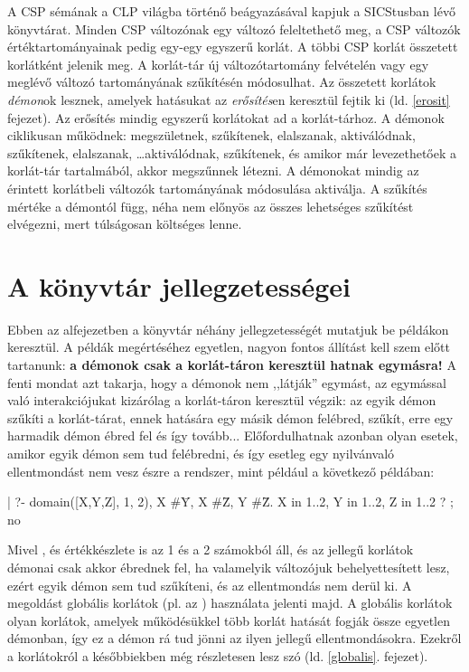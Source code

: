 A CSP sémának a CLP világba történő beágyazásával kapjuk a SICStusban lévő
\clpfd könyvtárat. Minden CSP változónak egy \clpfd változó feleltethető meg,
a CSP változók értéktartományainak pedig egy-egy \clpfd egyszerű korlát.
A többi CSP korlát összetett \clpfd korlátként jelenik meg. A \clpfd korlát-tár
új változótartomány felvételén vagy egy meglévő változó tartományának
szűkítésén módosulhat. Az összetett korlátok \emph{démon}ok lesznek, amelyek
hatásukat az \emph{erősítés}en keresztül fejtik ki (ld. \ref{erosit} fejezet).
Az erősítés mindig egyszerű korlátokat ad a korlát-tárhoz. A démonok ciklikusan
működnek: megszületnek, szűkítenek, elalszanak, aktiválódnak, szűkítenek,
elalszanak, \ldots aktiválódnak, szűkítenek, és amikor már levezethetőek a
korlát-tár tartalmából, akkor megszűnnek létezni. A démonokat mindig az
érintett korlátbeli változók tartományának módosulása aktiválja. A szűkítés
mértéke a démontól függ, néha nem előnyös az összes lehetséges szűkítést
elvégezni, mert túlságosan költséges lenne.

\section{A \clpfd könyvtár jellegzetességei}

Ebben az alfejezetben a \clpfd könyvtár néhány jellegzetességét mutatjuk be
példákon keresztül. A példák megértéséhez egyetlen, nagyon fontos állítást
kell szem előtt tartanunk: {\bf a \clpfd démonok csak a korlát-táron keresztül
hatnak egymásra!}
\br
A fenti mondat azt takarja, hogy a démonok nem ,,látják'' egymást, az
egymással való interakciójukat kizárólag a korlát-táron keresztül
végzik: az egyik démon szűkíti a korlát-tárat, ennek hatására egy
másik démon felébred, szűkít, erre egy harmadik démon ébred fel
és így tovább... Előfordulhatnak azonban olyan esetek, amikor egyik
démon sem tud felébredni, és így esetleg egy nyilvánvaló ellentmondást
nem vesz észre a rendszer, mint például a következő példában:

\begin{prologcode}
| ?- domain([X,Y,Z], 1, 2), X #\= Y, X #\= Z, Y #\= Z.
X in 1..2,
Y in 1..2,
Z in 1..2 ? ;
no
\end{prologcode}

Mivel ,  és  értékkészlete is az 1 és a 2 számokból
áll, és az  jellegű korlátok démonai csak akkor ébrednek fel, ha
valamelyik változójuk behelyettesített lesz, ezért egyik démon sem tud szűkíteni,
és az ellentmondás nem derül ki. A megoldást globális korlátok (pl. az
) használata jelenti majd. A globális korlátok olyan korlátok,
amelyek működésükkel több korlát hatását fogják össze egyetlen démonban, így
ez a démon rá tud jönni az ilyen jellegű ellentmondásokra. Ezekről a korlátokról
a későbbiekben még részletesen lesz szó (ld. \ref{globalis}. fejezet).

